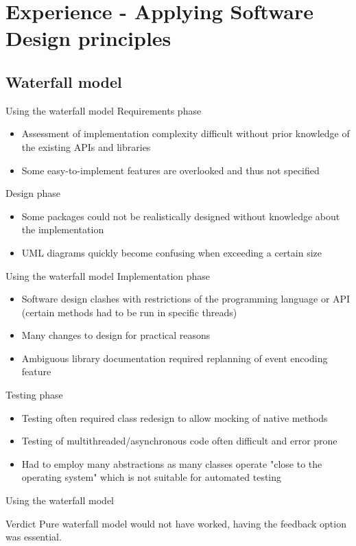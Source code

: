  \section{Experience - Applying Software Design principles}
 \subsection{Waterfall model}
\begin{frame}{Using the waterfall model}
Requirements phase
\begin{itemize}
\item Assessment of implementation complexity difficult without prior knowledge of the existing APIs and libraries
\item Some easy-to-implement features are overlooked and thus not specified
\end{itemize}
Design phase
\begin{itemize}
\item Some packages could not be realistically designed without knowledge about the implementation
\item UML diagrams quickly become confusing when exceeding a certain size
\end{itemize}

\end{frame}
\begin{frame}{Using the waterfall model}
Implementation phase
\begin{itemize}
\item Software design clashes with restrictions of the programming language or API (certain methods had to be run in specific threads)
\item Many changes to design for practical reasons
\item Ambiguous library documentation required replanning of event encoding feature
\end{itemize}

Testing phase
\begin{itemize}
\item Testing often required class redesign to allow mocking of native methods
\item Testing of multithreaded/asynchronous code often difficult and error prone
\item Had to employ many abstractions as many classes operate "close to the operating system" which is not suitable for automated testing
\end{itemize}
\end{frame}

\begin{frame}{Using the waterfall model}
\begin{block}{Verdict}
Pure waterfall model would not have worked, having the feedback option was essential.
\end{block}
\end{frame}